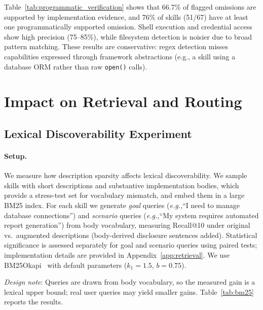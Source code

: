 \documentclass[11pt]{article}
\newcommand{\eg}{\textit{e.g.,}\xspace}
\begin{document}
Table~\ref{tab:programmatic_verification} shows that
66.7\% of flagged omissions are supported by
implementation evidence, and 76\% of skills (51/67)
have at least one programmatically supported omission.
Shell execution and credential access show high precision
(75--85\%), while filesystem detection is noisier due to
broad pattern matching.
These results are conservative: regex detection misses
capabilities expressed through framework abstractions
(e.g., a skill using a database ORM rather than raw
\texttt{open()} calls).

\section{Impact on Retrieval and Routing}
\label{sec:impact}

\subsection{Lexical Discoverability Experiment}

\paragraph{Setup.}
We measure how description sparsity affects lexical
discoverability.
We sample skills with short descriptions and substantive
implementation bodies, which provide a stress-test set for
vocabulary mismatch, and embed them in a large BM25 index.
For each skill we generate \emph{goal} queries
(\eg ``I need to manage database connections'') and
\emph{scenario} queries
(\eg ``My system requires automated report generation'')
from body vocabulary, measuring
Recall@10 under original vs.\ augmented descriptions
(body-derived disclosure sentences added).
Statistical significance is assessed separately for goal
and scenario queries using paired tests; implementation
details are provided in Appendix~\ref{app:retrieval}.
We use BM25Okapi~\cite{robertson2009bm25} with default
parameters ($k_1 = 1.5$, $b = 0.75$).

\emph{Design note}: Queries are drawn from body vocabulary,
so the measured gain is a lexical upper bound;
real user queries may yield smaller gains.
Table~\ref{tab:bm25} reports the results.
\end{document}

